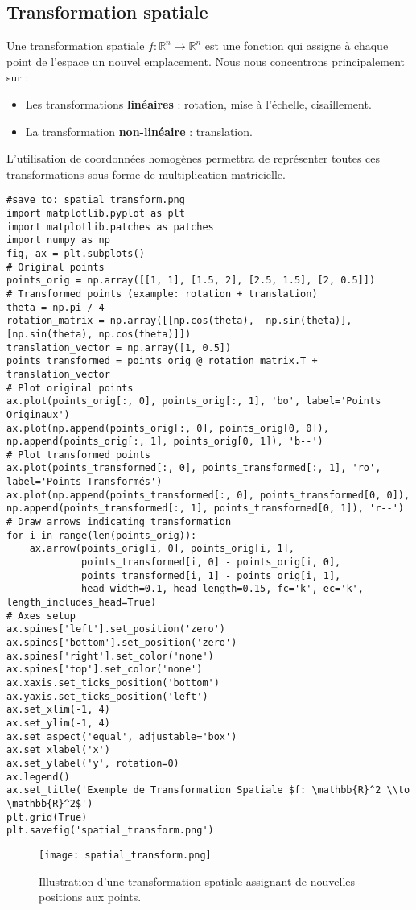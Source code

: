 \subsection{Transformation spatiale}
Une transformation spatiale \( f: \mathbb{R}^n \to \mathbb{R}^n \) est une fonction qui assigne à chaque point de l'espace un nouvel emplacement. Nous nous concentrons principalement sur :
\begin{itemize}
    \item Les transformations \textbf{linéaires} : rotation, mise à l'échelle, cisaillement.
    \item La transformation \textbf{non-linéaire} : translation.
\end{itemize}
L'utilisation de coordonnées homogènes permettra de représenter toutes ces transformations sous forme de multiplication matricielle.
\begin{verbatim}
#save_to: spatial_transform.png
import matplotlib.pyplot as plt
import matplotlib.patches as patches
import numpy as np
fig, ax = plt.subplots()
# Original points
points_orig = np.array([[1, 1], [1.5, 2], [2.5, 1.5], [2, 0.5]])
# Transformed points (example: rotation + translation)
theta = np.pi / 4
rotation_matrix = np.array([[np.cos(theta), -np.sin(theta)], [np.sin(theta), np.cos(theta)]])
translation_vector = np.array([1, 0.5])
points_transformed = points_orig @ rotation_matrix.T + translation_vector
# Plot original points
ax.plot(points_orig[:, 0], points_orig[:, 1], 'bo', label='Points Originaux')
ax.plot(np.append(points_orig[:, 0], points_orig[0, 0]), np.append(points_orig[:, 1], points_orig[0, 1]), 'b--')
# Plot transformed points
ax.plot(points_transformed[:, 0], points_transformed[:, 1], 'ro', label='Points Transformés')
ax.plot(np.append(points_transformed[:, 0], points_transformed[0, 0]), np.append(points_transformed[:, 1], points_transformed[0, 1]), 'r--')
# Draw arrows indicating transformation
for i in range(len(points_orig)):
    ax.arrow(points_orig[i, 0], points_orig[i, 1],
             points_transformed[i, 0] - points_orig[i, 0],
             points_transformed[i, 1] - points_orig[i, 1],
             head_width=0.1, head_length=0.15, fc='k', ec='k', length_includes_head=True)
# Axes setup
ax.spines['left'].set_position('zero')
ax.spines['bottom'].set_position('zero')
ax.spines['right'].set_color('none')
ax.spines['top'].set_color('none')
ax.xaxis.set_ticks_position('bottom')
ax.yaxis.set_ticks_position('left')
ax.set_xlim(-1, 4)
ax.set_ylim(-1, 4)
ax.set_aspect('equal', adjustable='box')
ax.set_xlabel('x')
ax.set_ylabel('y', rotation=0)
ax.legend()
ax.set_title('Exemple de Transformation Spatiale $f: \mathbb{R}^2 \\to \mathbb{R}^2$')
plt.grid(True)
plt.savefig('spatial_transform.png')
\end{verbatim}
\begin{figure}[H]
\centering
\texttt{[image: spatial\_transform.png]}
\caption{Illustration d'une transformation spatiale assignant de nouvelles positions aux points.}
\label{fig:spatial_transform}
\end{figure}
